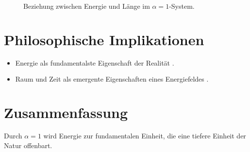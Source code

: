 \documentclass{article}
\begin{document}
	\begin{figure}[h]
		\centering
		\caption{Beziehung zwischen Energie und Länge im \(\alpha = 1\)-System.}
	\end{figure}
	
	\section{Philosophische Implikationen}
	\begin{itemize}
		\item Energie als fundamentalste Eigenschaft der Realität \cite{Wilczek2008}.
		\item Raum und Zeit als emergente Eigenschaften eines Energiefeldes \cite{Verlinde2011}.
	\end{itemize}
	
	\section{Zusammenfassung}
	Durch \(\alpha = 1\) wird Energie zur fundamentalen Einheit, die eine tiefere Einheit der Natur offenbart.
	
\end{document}
